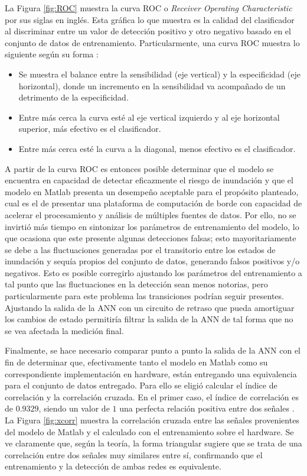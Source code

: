  La Figura \ref{fig:ROC} muestra la curva ROC o \textit{Receiver Operating Characteristic} por sus siglas en inglés. Esta gráfica lo que muestra es la calidad del clasificador al discriminar entre un valor de detección positivo y otro negativo basado en el conjunto de datos de entrenamiento. Particularmente, una curva ROC muestra lo siguiente según su forma \citep{ROCCurve}:
 
 \begin{itemize}
     \item Se muestra el balance entre la sensibilidad (eje vertical) y la especificidad (eje horizontal), donde un incremento en la sensibilidad va acompañado de un detrimento de la especificidad.
     \item Entre más cerca la curva esté al eje vertical izquierdo y al eje horizontal superior, más efectivo es el clasificador.
     \item Entre más cerca esté la curva a la diagonal, menos efectivo es el clasificador.
 \end{itemize}
 
A partir de la curva ROC es entonces posible determinar que el modelo se encuentra en capacidad de detectar eficazmente el riesgo de inundación y que el modelo en Matlab presenta un desempeño aceptable para el propósito planteado, cual es el de presentar una plataforma de computación de borde con capacidad de acelerar el procesamiento y análisis de múltiples fuentes de datos. Por ello, no se invirtió más tiempo en sintonizar los parámetros de entrenamiento del modelo, lo que ocasiona que este presente algunas detecciones falsas; esto mayoritariamente se debe a las fluctuaciones generadas por el transitorio entre los estados de inundación y sequía propios del conjunto de datos, generando falsos positivos y/o negativos. Esto es posible corregirlo ajustando los parámetros del entrenamiento a tal punto que las fluctuaciones en la detección sean menos notorias, pero particularmente para este problema las transiciones podrían seguir presentes. Ajustando la salida de la ANN con un circuito de retraso que pueda amortiguar los cambios de estado permitiría filtrar la salida de la ANN de tal forma que no se vea afectada la medición final.

Finalmente, se hace necesario comparar punto a punto la salida de la ANN con el fin de determinar que, efectivamente tanto el modelo en Matlab como su correspondiente implementación en hardware, están entregando una equivalencia para el conjunto de datos entregado. Para ello se eligió calcular el índice de correlación y la correlación cruzada. En el primer caso, el índice de correlación es de $0.9329$, siendo un valor de $1$ una perfecta relación positiva entre dos señales \citep{correlation2,correlation}. La Figura \ref{fig:xcorr} muestra la correlación cruzada entre las señales provenientes del modelo de Matlab y el calculado con el entrenamiento sobre el hardware. Se ve claramente que, según la teoría, la forma triangular sugiere que se trata de una correlación entre dos señales muy similares entre sí, confirmando que el entrenamiento y la detección de ambas redes es equivalente.


